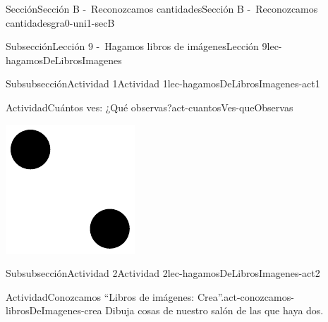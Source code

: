 \documentclass[twoside,10pt,]{article}
\begin{document}
\begin{sectionptx}{Sección}{Sección B -~Reconozcamos cantidades}{}{Sección B -~Reconozcamos cantidades}{}{}{gra0-uni1-secB}
\begin{subsectionptx}{Subsección}{Lección 9 -~Hagamos libros de imágenes}{}{Lección 9}{}{}{lec-hagamosDeLibrosImagenes}
\begin{subsubsectionptx}{Subsubsección}{Actividad 1}{}{Actividad 1}{}{}{lec-hagamosDeLibrosImagenes-act1}
\begin{activity}{Actividad}{Cuántos ves: ¿Qué observas?}{act-cuantosVes-queObservas}
\begin{sidebyside}{2}{0}{0}{0}
\begin{sbspanel}{0.5}
\end{sbspanel}%
\begin{sbspanel}{0.5}%
\includegraphics[width=\linewidth]{external/svg-source/tikz-file-147348.pdf}
\end{sbspanel}%
\end{sidebyside}%
\end{activity}%
\end{subsubsectionptx}
%
%
\typeout{************************************************}
\typeout{************************************************}
%
\begin{subsubsectionptx}{Subsubsección}{Actividad 2}{}{Actividad 2}{}{}{lec-hagamosDeLibrosImagenes-act2}
\begin{activity}{Actividad}{Conozcamos “Libros de imágenes: Crea”.}{act-conozcamos-librosDeImagenes-crea}%
Dibuja cosas de nuestro salón de las que haya dos.%
\begin{sidebyside}{2}{0.3}{0.3}{0}%
\begin{sbspanel}{0.2}%

\end{sbspanel}
\end{sidebyside}
\end{activity}
\end{subsubsectionptx}
\end{subsectionptx}
\end{sectionptx}
\end{document}
